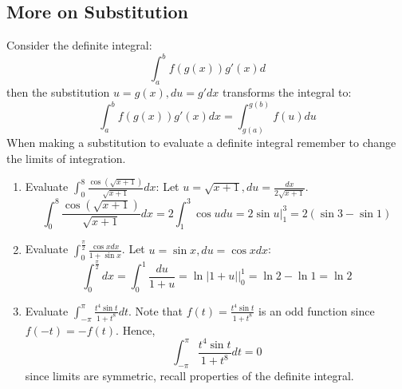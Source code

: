 \documentclass[11pt]{article}
\theoremstyle{plain}
\theoremstyle{remark}
\theoremstyle{plain}
\begin{document}
\subsection*{More on Substitution}
Consider the definite integral:
\[\int_a^b f(g(x))g'(x)d\] then the substitution $u=g(x), du=g'dx$ transforms the integral to:
\[\int_a^bf(g(x))g'(x)dx=\int_{g(a)}^{g(b)}f(u)du\] When making a substitution to evaluate a definite integral
remember to change the limits of integration.

\begin{tcolorbox}[colback=magenta!5!white,colframe=magenta!75!black,title=Problem 3 ]
    
        \begin{enumerate}
            \item Evaluate $\int_0^8\frac{\cos(\sqrt{x+1})}{\sqrt{x+1}}dx$:
            Let $u=\sqrt{x+1}, du=\frac{dx}{2\sqrt{x+1}}$.
            \[\int_0^8\frac{\cos(\sqrt{x+1})}{\sqrt{x+1}}dx=2\int_1^3\cos udu=2\sin u\Big|_1^3=2(\sin 3-\sin 1)\]

            \item Evaluate $\int_0^{\frac{\pi}{2}}\frac{\cos x dx}{1+\sin x}$. Let $u=\sin x, du=\cos x dx$:
            \[\int_0^{\frac{\pi}{2}}dx=\int_0^1\frac{du}{1+u}=\ln|1+u|\Big|_0^1=\ln 2-\ln 1= \ln 2\]

            \item Evaluate $\int_{-\pi}^{\pi}\frac{t^4\sin t}{1+t^8}dt$. Note that $f(t)=\frac{t^4\sin t}{1+t^8}$ is an odd function 
            since $f(-t)=-f(t)$. Hence,
            \[\int_{-\pi}^{\pi}\frac{t^4\sin t}{1+t^8}dt=0\] since limits are symmetric, recall properties of the definite integral.
        \end{enumerate}
 
\end{tcolorbox}   
\end{document}
